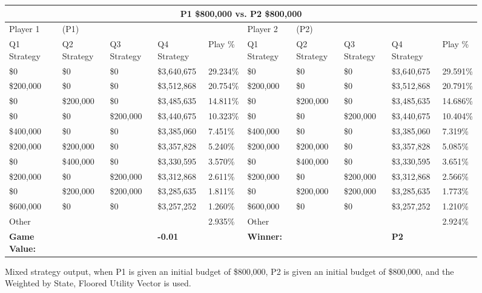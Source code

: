 \documentclass[11pt]{article}
\begin{document}
\begin{figure}
\tiny
\begin{tabular}{ |p{1.0cm}p{1.0cm}p{1.0cm}p{2.0cm}|p{1.0cm}||p{1.0cm}p{1.0cm}p{1.0cm}p{2.0cm}|p{1.0cm}|}
\hline
\multicolumn{10}{|c|}{P1 \$800,000 vs. P2 \$800,000} \\
\hline
Player 1 & (P1) & & & & Player 2 & (P2) & & & \\
\hline
Q1 Strategy & Q2 Strategy & Q3 Strategy & Q4 Strategy  &  Play \% & Q1 Strategy & Q2 Strategy & Q3 Strategy & Q4 Strategy  &  Play \%\\
\hline
\$0 & \$0 & \$0 & \$3,640,675  & 29.234\%               & \$0 & \$0 & \$0 & \$3,640,675  & 29.591\% \\
\$200,000 & \$0 & \$0 & \$3,512,868  & 20.754\%         & \$200,000 & \$0 & \$0 & \$3,512,868  & 20.791\% \\
\$0& \$200,000 & \$0 & \$3,485,635  & 14.811\%          & \$0& \$200,000 & \$0 & \$3,485,635  & 14.686\% \\
\$0 & \$0& \$200,000 & \$3,440,675  & 10.323\%          & \$0 & \$0& \$200,000 & \$3,440,675  & 10.404\% \\
\$400,000 & \$0 & \$0 & \$3,385,060  & 7.451\%          & \$400,000 & \$0 & \$0 & \$3,385,060  & 7.319\% \\
\$200,000& \$200,000 & \$0 & \$3,357,828  & 5.240\%     & \$200,000& \$200,000 & \$0 & \$3,357,828  & 5.085\% \\
\$0& \$400,000 & \$0 & \$3,330,595  & 3.570\%           & \$0& \$400,000 & \$0 & \$3,330,595  & 3.651\% \\
\$200,000 & \$0& \$200,000 & \$3,312,868  & 2.611\%      & \$200,000 & \$0& \$200,000 & \$3,312,868  & 2.566\% \\
\$0& \$200,000& \$200,000 & \$3,285,635  & 1.811\%      & \$0& \$200,000& \$200,000 & \$3,285,635  & 1.773\% \\
\$600,000 & \$0 & \$0 & \$3,257,252  & 1.260\%           & \$600,000 & \$0 & \$0 & \$3,257,252  & 1.210\% \\
\hline
Other &&&& 2.935\% & Other &&&& 2.924\% \\
\hline
\small \textbf{Game Value:} &&& \small \textbf{-0.01} && \small \textbf{Winner:} &&& \small \textbf{P2}&\\
\hline
\end{tabular}
\caption{Mixed strategy output, when P1 is given an initial budget of \$800,000, P2 is given an initial budget of \$800,000, and the Weighted by State, Floored Utility Vector is used.}
\label{8v8table.2}
\end{figure}
\end{document}

